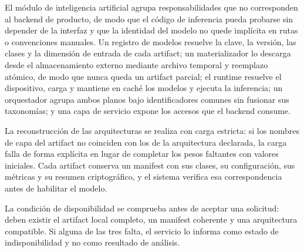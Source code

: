El módulo de inteligencia artificial agrupa responsabilidades que no corresponden al backend de producto, de modo que el código de inferencia pueda probarse sin depender de la interfaz y que la identidad del modelo no quede implícita en rutas o convenciones manuales. Un registro de modelos resuelve la clave, la versión, las clases y la dimensión de entrada de cada artifact; un materializador lo descarga desde el almacenamiento externo mediante archivo temporal y reemplazo atómico, de modo que nunca queda un artifact parcial; el runtime resuelve el dispositivo, carga y mantiene en caché los modelos y ejecuta la inferencia; un orquestador agrupa ambos planos bajo identificadores comunes sin fusionar sus taxonomías; y una capa de servicio expone los accesos que el backend consume.

La reconstrucción de las arquitecturas se realiza con carga estricta: si los nombres de capa del artifact no coinciden con los de la arquitectura declarada, la carga falla de forma explícita en lugar de completar los pesos faltantes con valores iniciales. Cada artifact conserva un manifest con sus clases, su configuración, sus métricas y su resumen criptográfico, y el sistema verifica esa correspondencia antes de habilitar el modelo.

La condición de disponibilidad se comprueba antes de aceptar una solicitud: deben existir el artifact local completo, un manifest coherente y una arquitectura compatible. Si alguna de las tres falta, el servicio lo informa como estado de indisponibilidad y no como resultado de análisis.
